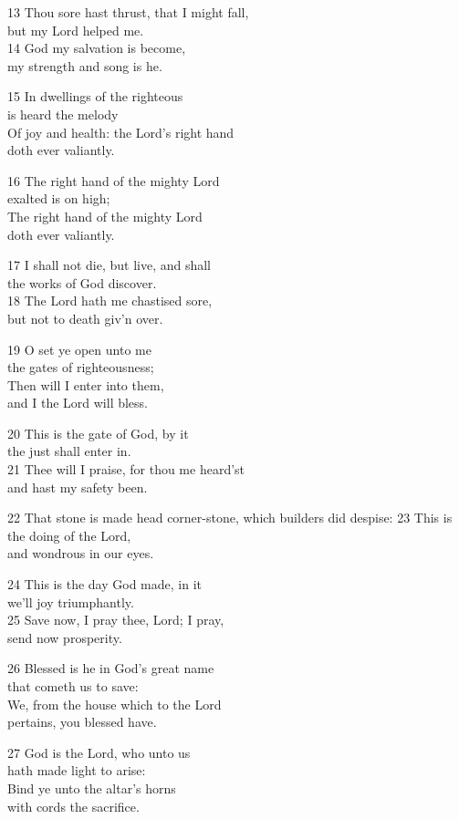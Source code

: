 13 Thou sore hast thrust, that I might fall,\\
but my Lord helped me.\\
14 God my salvation is become,\\
my strength and song is he.

15 In dwellings of the righteous\\
is heard the melody\\
Of joy and health: the Lord’s right hand\\
doth ever valiantly.

16 The right hand of the mighty Lord\\
exalted is on high;\\
The right hand of the mighty Lord\\
doth ever valiantly.

17 I shall not die, but live, and shall\\
the works of God discover.\\
18 The Lord hath me chastised sore,\\
but not to death giv’n over.

19 O set ye open unto me\\
the gates of righteousness;\\
Then will I enter into them,\\
and I the Lord will bless.

20 This is the gate of God, by it\\
the just shall enter in.\\
21 Thee will I praise, for thou me heard’st\\
and hast my safety been.

22 That stone is made head corner-stone,
which builders did despise:
23 This is the doing of the Lord,\\
and wondrous in our eyes.

24 This is the day God made, in it\\
we’ll joy triumphantly.\\
25 Save now, I pray thee, Lord; I pray,\\
send now prosperity.

26 Blessed is he in God’s great name\\
that cometh us to save:\\
We, from the house which to the Lord\\
pertains, you blessed have.

27 God is the Lord, who unto us\\
hath made light to arise:\\
Bind ye unto the altar’s horns\\
with cords the sacrifice.

